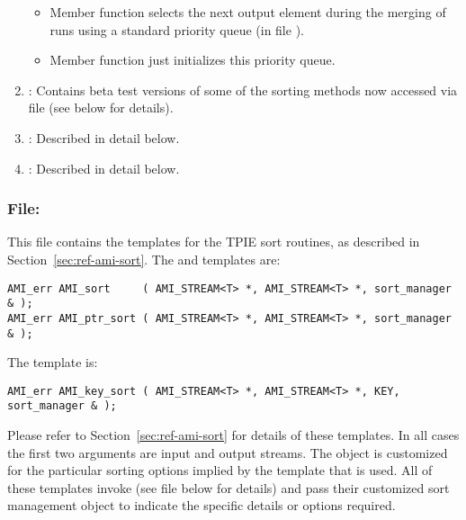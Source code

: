 \begin{enumerate}
\begin{itemize}
        \item Member function  selects the
        next output element during the merging of runs using
        a standard priority queue (in file
        ).
        
        \item Member function  just
        initializes this priority queue.
    \end{itemize}
    
    \item {}: Contains
    beta test versions of some of the sorting methods now
    accessed via file  (see below for
    details).

    \item {}: Described in detail below.

    \item {}: Described in detail below.

\end{enumerate}

\subsubsection{File: }
     
This file contains the templates for the TPIE sort routines,
as described in Section~\ref{sec:ref-ami-sort}.  The
 and  templates are:
\begin{verbatim}
AMI_err AMI_sort     ( AMI_STREAM<T> *, AMI_STREAM<T> *, sort_manager & );
AMI_err AMI_ptr_sort ( AMI_STREAM<T> *, AMI_STREAM<T> *, sort_manager & );
\end{verbatim}

The  template is:
\begin{verbatim}
AMI_err AMI_key_sort ( AMI_STREAM<T> *, AMI_STREAM<T> *, KEY, sort_manager & );
\end{verbatim}

Please refer to Section~\ref{sec:ref-ami-sort} for details
of these templates.
In all cases the first two arguments are input and output
streams. The  object is customized for
the particular sorting options implied by the template that
is used. All of these templates invoke
 (see file
 below for details) and pass their
customized sort management object to indicate the specific
details or options required.

